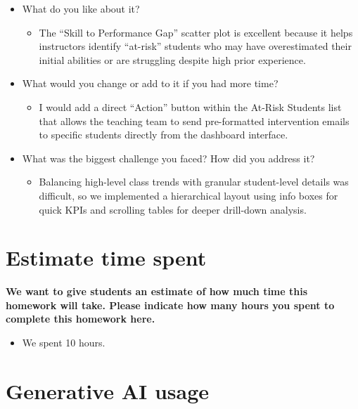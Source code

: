\documentclass[
]{article}
\providecommand{\tightlist}{%
  \setlength{\itemsep}{0pt}\setlength{\parskip}{0pt}}
\begin{document}
\begin{itemize}
\tightlist
\item
  What do you like about it?

  \begin{itemize}
  \tightlist
  \item
    The ``Skill to Performance Gap'' scatter plot is excellent because
    it helps instructors identify ``at-risk'' students who may have
    overestimated their initial abilities or are struggling despite high
    prior experience.
  \end{itemize}
\item
  What would you change or add to it if you had more time?

  \begin{itemize}
  \tightlist
  \item
    I would add a direct ``Action'' button within the At-Risk Students
    list that allows the teaching team to send pre-formatted
    intervention emails to specific students directly from the dashboard
    interface.
  \end{itemize}
\item
  What was the biggest challenge you faced? How did you address it?

  \begin{itemize}
  \tightlist
  \item
    Balancing high-level class trends with granular student-level
    details was difficult, so we implemented a hierarchical layout using
    info boxes for quick KPIs and scrolling tables for deeper drill-down
    analysis.
  \end{itemize}
\end{itemize}

\section{Estimate time spent}\label{estimate-time-spent}

\textbf{We want to give students an estimate of how much time this
homework will take. Please indicate how many hours you spent to complete
this homework here.}

\begin{itemize}
\tightlist
\item
  We spent 10 hours.
\end{itemize}

\section{Generative AI usage}\label{generative-ai-usage}
\end{document}
